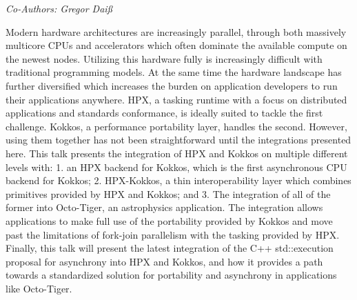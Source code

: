 \begin{center}
\textit{Co-Authors: Gregor	Daiß}
\end{center} 
Modern hardware architectures are increasingly parallel, through both massively multicore CPUs and accelerators which often dominate the available compute on the newest nodes. Utilizing this hardware fully is increasingly difficult with traditional programming models. At the same time the hardware landscape has further diversified which increases the burden on application developers to run their applications anywhere. HPX, a tasking runtime with a focus on distributed applications and standards conformance, is ideally suited to tackle the first challenge. Kokkos, a performance portability layer, handles the second. However, using them together has not been straightforward until the integrations presented here. This talk presents the integration of HPX and Kokkos on multiple different levels with: 1. an HPX backend for Kokkos, which is the first asynchronous CPU backend for Kokkos; 2. HPX-Kokkos, a thin interoperability layer which combines primitives provided by HPX and Kokkos; and 3. The integration of all of the former into Octo-Tiger, an astrophysics application. The integration allows applications to make full use of the portability provided by Kokkos and move past the limitations of fork-join parallelism with the tasking provided by HPX. Finally, this talk will present the latest integration of the C++ std::execution proposal for asynchrony into HPX and Kokkos, and how it provides a path towards a standardized solution for portability and asynchrony in applications like Octo-Tiger.